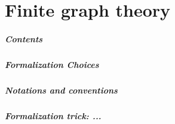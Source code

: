 \chapter{Finite graph theory}


\paragraph{Contents}

\paragraph{Formalization Choices}

\paragraph{Notations and conventions}

\paragraph{Formalization trick: ...}


